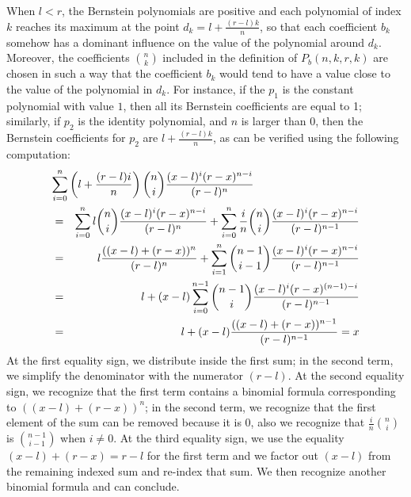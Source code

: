 \documentclass{mscs}
\begin{document}
When \(l < r\), the Bernstein polynomials are positive and each polynomial
of index \(k\) reaches its maximum at the point \(d_k=l+\frac{(r-l)k}{n}\), so
that each coefficient \(b_k\) somehow has a dominant influence on the value
of the polynomial around \(d_k\).  Moreover, the coefficients
\(\binom{n}{k}\) included in the definition of \(P_b(n,k,r,k)\) are chosen
in such a way that the coefficient \(b_k\) would tend to have a value
close to the value of the polynomial in \(d_k\).  For instance, if the
\(p_1\) is the constant polynomial with value \(1\), then all its Bernstein
coefficients are equal to 1; similarly, if \(p_2\) is the identity polynomial,
and \(n\) is larger than \(0\),
then the Bernstein coefficients for \(p_2\)
are \(l + \frac{(r-l) k}{n}\), as can
be verified using the following computation:
\begin{eqnarray*}
\lefteqn{\sum_{i=0}^n \left(l + \frac{(r-l)i}{n}\right) \binom{n}{i} \frac{(x-l)^i (r-x)^{n-i}}
{(r-l)^n}}\\
&=& \sum_{i=0}^n l \binom{n}{i}\frac{(x-l)^i(r-x)^{n-i}}{(r-l)^n} +
\sum_{i=0}^n \frac{i}{n}\binom{n}{i}\frac{(x-l)^i(r-x)^{n-i}}{(r-l)^{n-1}}\\
&=& l \frac{((x -l) + (r - x))^n}{(r-l)^n} +\sum_{i=1}^n \binom{n-1}{i-1}\frac{(x-l)^i(r-x)^{n-i}}{(r-l)^{n-1}}\\
&=& l +{ (x-l)\sum_{i=0}^{n-1}\binom{n-1}{i} \frac{(x-l)^i(r-x)^{(n-1)-i}}
{(r-l)^{n-1}}}\\
&=& l + (x -l) \frac{((x-l) + (r - x))^{n-1}}{(r-l)^{n-1}} = x
\end{eqnarray*}
At the first equality sign, we distribute inside the first sum; in the
second term, we simplify the denominator with the numerator \((r-l)\).
At the second equality sign, we recognize that the first term contains
a binomial formula corresponding to \(((x-l)+(r-x))^n\); in the second
term, we recognize that the first element of the sum can be removed
because it is 0, also we recognize that \(\frac{i}{n}\binom{n}{i}\) is
\(\binom{n-1}{i-1}\) when \(i\neq 0\).  At the third equality sign,
we use the equality \((x-l)+(r-x)=r-l\) for the first term and
we factor out \((x-l)\) from the remaining indexed sum and re-index that sum.
We then recognize another binomial formula and can conclude.
\end{document}
